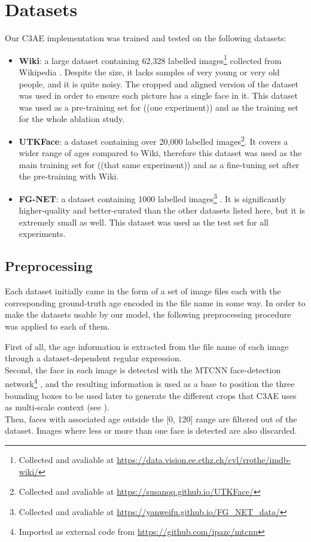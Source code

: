 
\chapter{Datasets}

Our C3AE implementation was trained and tested on the following datasets:

\begin{itemize}
  \item \textbf{Wiki}:
    a large dataset containing 62,328 labelled
    images\footnote{Collected and avaliable at \url{https://data.vision.ee.ethz.ch/cvl/rrothe/imdb-wiki/}}
    collected from Wikipedia \cite{wiki}.
    Despite the size, it lacks samples of very young
    or very old people, and it is quite noisy.
    The cropped and aligned version of the dataset
    was used in order to ensure each picture has a single face in it.
    This dataset was used as a pre-training set for ((one experiment))
    and as the training set for the whole ablation study.
  \item \textbf{UTKFace}:
    a dataset containing over 20,000 labelled
    images\footnote{Collected and avaliable at \url{https://susanqq.github.io/UTKFace/}}.
    It covers a wider range of ages compared to Wiki,
    therefore this dataset was used as the main training set
    for ((that same experiment)) and as a fine-tuning set after
    the pre-training with Wiki.
  \item \textbf{FG-NET}:
    a dataset containing 1000 labelled
    images\footnote{Collected and avaliable at \url{https://yanweifu.github.io/FG_NET_data/}}
    \cite{fgnet}.
    It is significantly higher-quality and better-curated than the other
    datasets listed here, but it is extremely small as well.
    This dataset was used as the test set for all experiments.
\end{itemize}

\section{Preprocessing}
Each dataset initially came in the form of a set of image files each with the
corresponding ground-truth age encoded in the file name in some way.
In order to make the datasets usable by our model, the following
preprocessing procedure was applied to each of them.

First of all, the age information is extracted from the file name of each
image through a dataset-dependent regular expression. \\
Second, the face in each image is detected with the MTCNN face-detection
network\footnote{Imported as external code from \url{https://github.com/ipazc/mtcnn}}
\cite{mtcnn}, and the resulting information is used as a base to position
the three bounding boxes to be used later to generate the different crops
that C3AE uses as multi-scale context (see ). \\
Then, faces with associated age outside the [0, 120] range are filtered
out of the dataset. Images where less or more than one face is detected
are also discarded.

